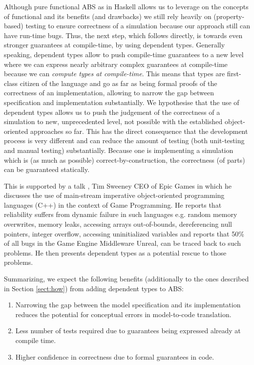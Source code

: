 Although pure functional ABS as in Haskell allows us to leverage on the concepts of functional and its benefits (and drawbacks) we still rely heavily on (property-based) testing to ensure correctness of a simulation because our approach still can have run-time bugs. Thus, the next step, which follows directly, is towards even stronger guarantees at compile-time, by using dependent types. Generally speaking, dependent types allow to push compile-time guarantees to a new level where we can express nearly arbitrary complex guarantees at compile-time because we can \textit{compute types at compile-time}. This means that types are first-class citizen of the language and go as far as being formal proofs of the correctness of an implementation, allowing to narrow the gap between specification and implementation substantially. We hypothesise that the use of dependent types allows us to push the judgement of the correctness of a simulation to new, unprecedented level, not possible with the established object-oriented approaches so far. This has the direct consequence that the development process is very different and can reduce the amount of testing (both unit-testing and manual testing) substantially. Because one is implementing a simulation which is (as much as possible) correct-by-construction, the correctness (of parts) can be guaranteed statically.

This is supported by a talk \cite{sweeney_next_2006}, Tim Sweeney CEO of Epic Games in which he discusses the use of main-stream imperative object-oriented programming languages (C++) in the context of Game Programming. He reports that reliability suffers from dynamic failure in such languages e.g. random memory overwrites, memory leaks, accessing arrays out-of-bounds, dereferencing null pointers, integer overflow, accessing uninitialized variables and reports that 50\% of all bugs in the Game Engine Middleware Unreal, can be traced back to such problems. He then presents dependent types as a potential rescue to those problems. %

Summarizing, we expect the following benefits (additionally to the ones described in Section \ref{sect:how}) from adding dependent types to ABS:

\begin{enumerate}
	\item Narrowing the gap between the model specification and its implementation reduces the potential for conceptual errors in model-to-code translation.
	\item Less number of tests required due to guarantees being expressed already at compile time.
	\item Higher confidence in correctness due to formal guarantees in code.
\end{enumerate}

